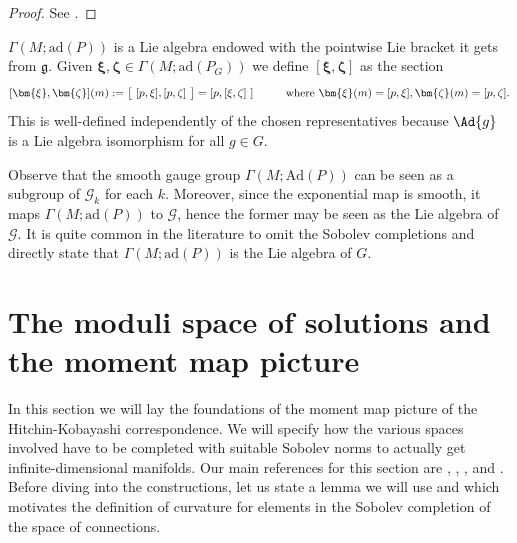 \begin{proof}
    See \parencite{mitter1981bundle}.
\end{proof}

\begin{obs} \label{obs_def_bracket_sections}
    \(\Gamma(M; \mathrm{ad}(P))\) is a Lie algebra endowed with the pointwise Lie bracket it gets from \(\mathfrak{g}\). Given \(\bm{\xi}, \bm{\zeta}\in \Gamma(M; \mathrm{ad}(P_G))\) we define \([\bm{\xi}, \bm{\zeta}]\) as the section 
    \[
   [\bm{\xi}, \bm{\zeta}](m):= \big[\ [p, \xi], [p, \zeta] \ \big ]=[p, [\xi, \zeta]\ ] \hspace{1 cm} \text{where } \bm{\xi}(m)=[p, \xi], \bm{\zeta}(m)=[p, \zeta].
    \]
    This is well-defined independently of the chosen representatives because \(\Ad{g}\) is a Lie algebra isomorphism for all \(g \in G\).
\end{obs}

Observe that the smooth gauge group \(\Gamma(M;\mathrm{Ad}(P))\) can be seen as a subgroup of \(\mathscr{G}_k\) for each \(k\). Moreover, since the exponential map is smooth, it maps \(\Gamma(M; \mathrm{ad}(P))\) to \(\mathscr{G}\), hence the former may be seen as the Lie algebra of \(\mathscr{G}\). It is quite common in the literature to omit the Sobolev completions and directly state that \(\Gamma(M; \mathrm{ad}(P))\) is the Lie algebra of \(G\). 

\section{The moduli space of solutions and the moment map picture}\label{section_moment_map_picture}
In this section we will lay the foundations of the moment map picture of the Hitchin-Kobayashi correspondence. We will specify how the various spaces involved have to be completed with suitable Sobolev norms to actually get infinite-dimensional manifolds. Our main references for this section are \parencite{mitter1981bundle}, \parencite{trautwein2015surveygitpictureyangmills}, \parencite{BrongersMST}, \parencite{LarsMartin_Notes_HK} and \parencite{Rudolph_2017pug}. Before diving into the constructions, let us state a lemma we will use and which motivates the definition of curvature for elements in the Sobolev completion of the space of connections.


